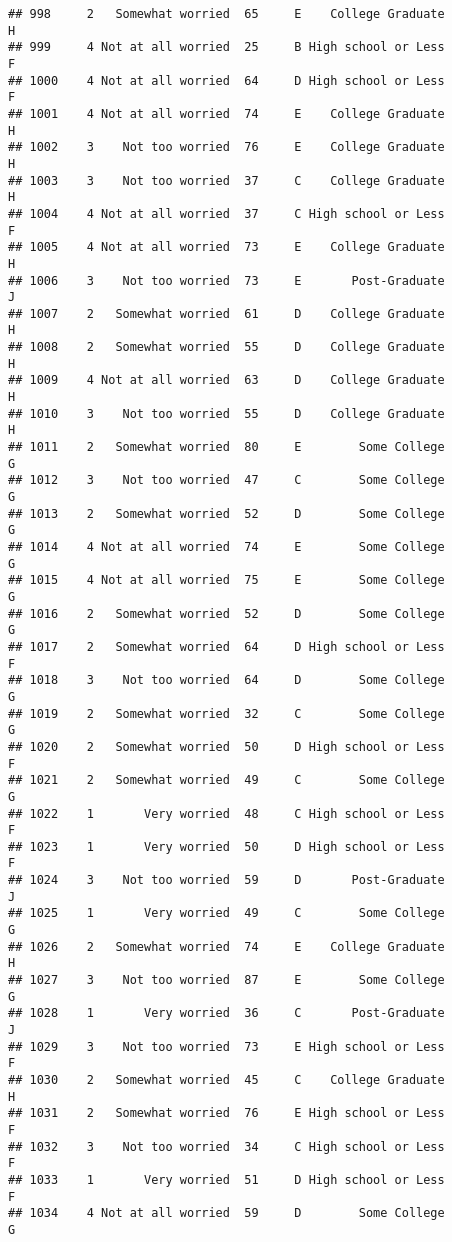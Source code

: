 \documentclass[
]{article}
\begin{document}
\begin{verbatim}
## 998     2   Somewhat worried  65     E    College Graduate         H
## 999     4 Not at all worried  25     B High school or Less         F
## 1000    4 Not at all worried  64     D High school or Less         F
## 1001    4 Not at all worried  74     E    College Graduate         H
## 1002    3    Not too worried  76     E    College Graduate         H
## 1003    3    Not too worried  37     C    College Graduate         H
## 1004    4 Not at all worried  37     C High school or Less         F
## 1005    4 Not at all worried  73     E    College Graduate         H
## 1006    3    Not too worried  73     E       Post-Graduate         J
## 1007    2   Somewhat worried  61     D    College Graduate         H
## 1008    2   Somewhat worried  55     D    College Graduate         H
## 1009    4 Not at all worried  63     D    College Graduate         H
## 1010    3    Not too worried  55     D    College Graduate         H
## 1011    2   Somewhat worried  80     E        Some College         G
## 1012    3    Not too worried  47     C        Some College         G
## 1013    2   Somewhat worried  52     D        Some College         G
## 1014    4 Not at all worried  74     E        Some College         G
## 1015    4 Not at all worried  75     E        Some College         G
## 1016    2   Somewhat worried  52     D        Some College         G
## 1017    2   Somewhat worried  64     D High school or Less         F
## 1018    3    Not too worried  64     D        Some College         G
## 1019    2   Somewhat worried  32     C        Some College         G
## 1020    2   Somewhat worried  50     D High school or Less         F
## 1021    2   Somewhat worried  49     C        Some College         G
## 1022    1       Very worried  48     C High school or Less         F
## 1023    1       Very worried  50     D High school or Less         F
## 1024    3    Not too worried  59     D       Post-Graduate         J
## 1025    1       Very worried  49     C        Some College         G
## 1026    2   Somewhat worried  74     E    College Graduate         H
## 1027    3    Not too worried  87     E        Some College         G
## 1028    1       Very worried  36     C       Post-Graduate         J
## 1029    3    Not too worried  73     E High school or Less         F
## 1030    2   Somewhat worried  45     C    College Graduate         H
## 1031    2   Somewhat worried  76     E High school or Less         F
## 1032    3    Not too worried  34     C High school or Less         F
## 1033    1       Very worried  51     D High school or Less         F
## 1034    4 Not at all worried  59     D        Some College         G

\end{verbatim}
\end{document}
